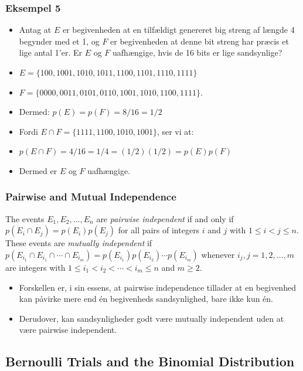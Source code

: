\documentclass{beamer}
\begin{document}
\begin{frame}
  \frametitle{Eksempel 5}
  \begin{itemize}
  \item<1-> Antag at $E$ er begivenheden at en tilfældigt genereret big streng af længde 4 begynder med et 1, og $F$ er begivenheden at denne bit streng har præcis et lige antal 1'er. Er $E$ og $F$ uafhængige, hvis de 16 bits er lige sandsynlige?
  \item<2-> $E = \{100, 1001, 1010, 1011, 1100, 1101, 1110, 1111\}$
  \item<2-> $F = \{0000, 0011, 0101, 0110, 1001, 1010, 1100, 1111\}$.
  \item<3-> Dermed: $p(E) = p(F) = 8/16 = 1/2$
  \item<3-> Fordi $E \cap F = \{1111, 1100, 1010, 1001\}$, ser vi at:
  \item<3-> $p(E \cap F) = 4/16 = 1/4 = (1/2)(1/2) = p(E)p(F)$
  \item<3-> Dermed er $E$ og $F$ uafhængige.
  \end{itemize}
\end{frame}

\begin{frame}
  \frametitle{Pairwise and Mutual Independence}
  \begin{definition}[Definition 5]
    The events $E_{1}, E_{2}, \ldots, E_{n}$ are \textit{pairwise independent} if and only if $p(E_{i} \cap E_{j})=p(E_{i})p(E_{j})$ for all pairs of integers $i$ and $j$ with $1 \leq i< j \leq n$. These events are \textit{mutually independent} if $p(E_{i_{1}} \cap E_{i_{1}} \cap \cdots \cap E_{i_{m}}) = p(E_{i_{1}})p(E_{i_{2}}) \cdots p(E_{i_{m}})$ whenever $i_{j}, j = 1, 2, \ldots, m$ are integers with $1 \leq i_{1} < i_{2} < \cdots < i_{m} \leq n$ and $m \geq 2$.
  \end{definition}
  \begin{itemize}
  \item Forskellen er, i sin essens, at pairwise independence tillader at en begivenhed kan påvirke mere end én begivenheds sandsynlighed, bare ikke kun én.
  \item Derudover, kan sandsynligheder godt være mutually independent uden at være pairwise independent.
  \end{itemize}
\end{frame}

\subsection{Bernoulli Trials and the Binomial Distribution}
\label{subsec:bernoulli}
\end{document}
